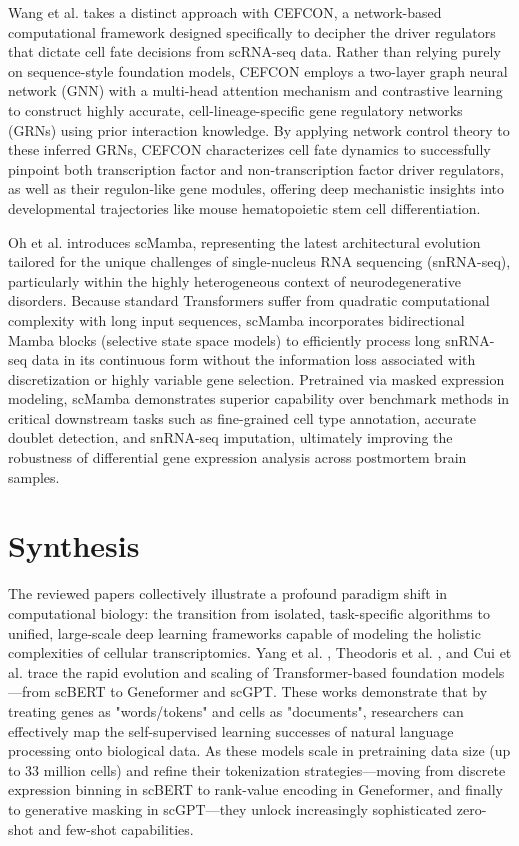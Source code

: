 \documentclass[12pt]{article}
\begin{document}
Wang et al. \cite{wang2023deciphering} takes a distinct approach with CEFCON, a network-based computational framework designed specifically to decipher the driver regulators that dictate cell fate decisions from scRNA-seq data. Rather than relying purely on sequence-style foundation models, CEFCON employs a two-layer graph neural network (GNN) with a multi-head attention mechanism and contrastive learning to construct highly accurate, cell-lineage-specific gene regulatory networks (GRNs) using prior interaction knowledge. By applying network control theory to these inferred GRNs, CEFCON characterizes cell fate dynamics to successfully pinpoint both transcription factor and non-transcription factor driver regulators, as well as their regulon-like gene modules, offering deep mechanistic insights into developmental trajectories like mouse hematopoietic stem cell differentiation.

Oh et al. \cite{oh2025scmamba} introduces scMamba, representing the latest architectural evolution tailored for the unique challenges of single-nucleus RNA sequencing (snRNA-seq), particularly within the highly heterogeneous context of neurodegenerative disorders. Because standard Transformers suffer from quadratic computational complexity with long input sequences, scMamba incorporates bidirectional Mamba blocks (selective state space models) to efficiently process long snRNA-seq data in its continuous form without the information loss associated with discretization or highly variable gene selection. Pretrained via masked expression modeling, scMamba demonstrates superior capability over benchmark methods in critical downstream tasks such as fine-grained cell type annotation, accurate doublet detection, and snRNA-seq imputation, ultimately improving the robustness of differential gene expression analysis across postmortem brain samples.

\section{Synthesis}

The reviewed papers collectively illustrate a profound paradigm shift in computational biology: the transition from isolated, task-specific algorithms to unified, large-scale deep learning frameworks capable of modeling the holistic complexities of cellular transcriptomics. Yang et al. \cite{yang2022scbert}, Theodoris et al. \cite{theodoris2023transfer}, and Cui et al. \cite{cui2024scgpt} trace the rapid evolution and scaling of Transformer-based foundation models—from scBERT to Geneformer and scGPT. These works demonstrate that by treating genes as "words/tokens" and cells as "documents", researchers can effectively map the self-supervised learning successes of natural language processing onto biological data. As these models scale in pretraining data size (up to 33 million cells) and refine their tokenization strategies—moving from discrete expression binning in scBERT to rank-value encoding in Geneformer, and finally to generative masking in scGPT—they unlock increasingly sophisticated zero-shot and few-shot capabilities.
\end{document}
